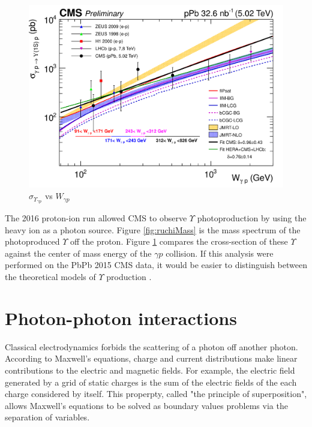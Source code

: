 \begin{figure}[h!]
\begin{centering}
\includegraphics[width=4.5in]{Chapter2/importfigs/Upsilon_1S_data_theory_fitall_160316.png}
\par\end{centering}
\caption{$\sigma_{\Upsilon_{\gamma p}}$ vs $W_{\gamma p}$ \cite{Chudasama:2016eck} \label{fig:ruchiXsec}}
\end{figure} 
 
The 2016 proton-ion run allowed CMS to observe $\Upsilon$ photoproduction by using the heavy ion as a photon source. Figure \ref{fig:ruchiMass} is the mass spectrum of the photoproduced $\Upsilon$ off the proton. Figure \ref{fig:ruchiXsec} compares the cross-section of these $\Upsilon$ against the center of mass energy of the $\gamma p$ collision. If this analysis were performed on the PbPb 2015 CMS data, it would be easier to distinguish between the theoretical models of $\Upsilon$ production \cite{Chudasama:2016eck}. 

\section{Photon-photon interactions}

Classical electrodynamics forbids the scattering of a photon off another photon. According to Maxwell's equations, charge and current distributions make linear contributions to the electric and magnetic fields. For example, the electric field generated by a grid of static charges is the sum of the electric fields of the each charge considered by itself. This properpty, called "the principle of superposition", allows Maxwell's equations to be solved as boundary values problems via the separation of variables.

